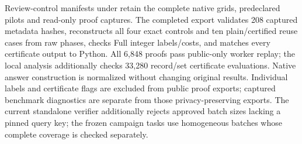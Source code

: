 Review-control manifests under  retain the complete native grids, predeclared pilots and read-only proof captures. The completed export validates 208 captured metadata hashes, reconstructs all four exact controls and ten plain/certified reuse cases from raw phases, checks Full integer labels/costs, and matches every certificate output to Python. All 6,848 proofs pass public-only worker replay; the local analysis additionally checks 33,280 record/set certificate evaluations. Native answer construction is normalized without changing original results. Individual labels and certificate flags are excluded from public proof exports; captured benchmark diagnostics are separate from those privacy-preserving exports. The current standalone verifier additionally rejects approved batch sizes lacking a pinned query key; the frozen campaign tasks use homogeneous batches whose complete coverage is checked separately.
